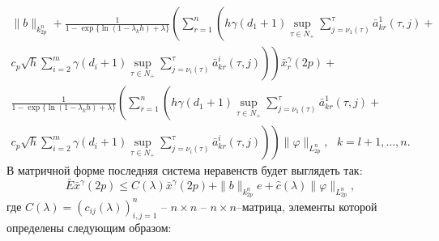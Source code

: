 $$
\begin{array}{crl}
\|b\|_{k^n_{2p}}  + \frac{1}{1-\exp\{\ln(1-\lambda_kh)+\lambda\}}
\left(\sum \limits _{r=1 }^n \left(h\gamma (d_1 +1)\mathrel {\mathop
{\sup} \limits _{\tau \in N_+}}\sum \limits _{j=\nu
_1 (\tau)}^{\tau}\bar a^{1}_{kr}(\tau,j) + \right. \right. \\
\left.\left. c_p\sqrt{h}\sum \limits _{i=2}^{m}\gamma (d_i +1)\mathrel
{\mathop {\sup} \limits _{\tau \in N_+}}\sum \limits _{j=\nu _i
(\tau)}^{\tau}\bar a^{i}_{kr}(\tau,j)\right) \right)\bar x_r^\gamma (2p)+\\
\frac{1}{1-\exp\{\ln(1-\lambda_kh)+\lambda\}} \left(\sum \limits
_{r=1 }^n \left(h\gamma (d_1 +1)\mathrel {\mathop {\sup} \limits _{\tau \in
N_+}}\sum \limits _{j=\nu
_1 (\tau)}^{\tau}\bar a^{1}_{kr}(\tau,j) +\right. \right.\\
\left.\left.c_p\sqrt{h}\sum \limits _{i=2}^{m}\gamma (d_i
+1)\mathrel {\mathop {\sup} \limits _{\tau \in N_+}}\sum \limits
_{j=\nu _i (\tau)}^{\tau}\bar a^{i}_{kr}(\tau,j)\right) \right)\|\varphi \|_{L_{2p}^n}, \ \ \ k = l+1,\dots,n.
\end{array}
$$
В матричной форме последняя система неравенств будет выглядеть так:
$$
\bar E\bar x^\gamma (2p) \leq C(\lambda )\bar x^\gamma (2p)+
\|b\|_{k^n_{2p}}e + \hat c(\lambda )\|\varphi \|_{L_{2p}^n},
$$
где  $C(\lambda) =(c_{ij}(\lambda))_{i,j=1}^n$ -- $n\times
n$ -- $n\times n$--матрица, элементы которой определены следующим образом:
